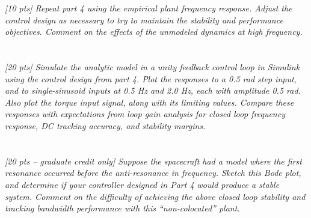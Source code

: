 \documentclass{article}
\begin{document}
\textit{[10 pts] Repeat part 4 using the empirical plant frequency response. Adjust the control design as necessary to try to maintain the stability and performance objectives. Comment on the effects of the unmodeled dynamics at high frequency.}

\section{}

\textit{[20 pts] Simulate the analytic model in a unity feedback control loop in Simulink using the control design from part 4. Plot the responses to a 0.5 rad step input, and to single-sinusoid inputs at 0.5 Hz and 2.0 Hz, each with amplitude 0.5 rad. Also plot the torque input signal, along with its limiting values. Compare these responses with expectations from loop gain analysis for closed loop frequency response, DC tracking accuracy, and stability margins.}

\section{}

\textit{[20 pts – graduate credit only] Suppose the spacecraft had a model where the first resonance occurred before the anti-resonance in frequency. Sketch this Bode plot, and determine if your controller designed in Part 4 would produce a stable system. Comment on the difficulty of achieving the above closed loop stability and tracking bandwidth performance with this “non-colocated” plant.}
\end{document}
